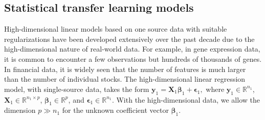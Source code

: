 \documentclass[twoside,12pt]{article}
\newcommand{\mb}[1]{\boldsymbol{\mathbf{#1}}}
\begin{document}
	\subsection{Statistical transfer learning models}
	
	High-dimensional linear models based on one source data with suitable regularizations have been developed extensively over the past decade \citep{tibshirani1996regression, FanLi} due to the high-dimensional nature of real-world data.
	For example, in gene expression data, it is common to encounter a few observations but hundreds of thousands of genes.
	In financial data, it is widely seen that the number of features is much larger than the number of individual stocks. 
	The high-dimensional linear regression model, with single-source data, takes the form
	$\mb y_1=\mb X_1\mb\beta_1+\mb\epsilon_1,$
	where $\mb y_1\in\mathbb{R}^{n_1}$, $\mb X_1\in\mathbb{R}^{n_1\times p}$, $\mb\beta_1\in\mathbb{R}^{p}$, and $\mb\epsilon_1\in\mathbb{R}^{n_1}$.
	With the high-dimensional data, we allow the dimension $p\gg n_1$ for the unknown coefficient vector $\mb\beta_1$.
	
\end{document}
